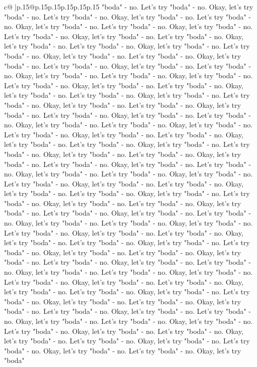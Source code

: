 \documentclass{article}
\begin{document}
{\begin{supertabular}{c@{$\;$}|p{.15\linewidth}@{}p{.15\linewidth}p{.15\linewidth}p{.15\linewidth}p{.15\linewidth}p{.15\linewidth}}
{{{"boda" {-} no. Let's try "boda" {-} no. Okay, let's try "boda" {-} no. Let's try "boda" {-} no. Okay, let's try "boda" {-} no. Let's try "boda" {-} no. Okay, let's try "boda" {-} no. Let's try "boda" {-} no. Okay, let's try "boda" {-} no. Let's try "boda" {-} no. Okay, let's try "boda" {-} no. Let's try "boda" {-} no. Okay, let's try "boda" {-} no. Let's try "boda" {-} no. Okay, let's try "boda" {-} no. Let's try "boda" {-} no. Okay, let's try "boda" {-} no. Let's try "boda" {-} no. Okay, let's try "boda" {-} no. Let's try "boda" {-} no. Okay, let's try "boda" {-} no. Let's try "boda" {-} no. Okay, let's try "boda" {-} no. Let's try "boda" {-} no. Okay, let's try "boda" {-} no. Let's try "boda" {-} no. Okay, let's try "boda" {-} no. Let's try "boda" {-} no. Okay, let's try "boda" {-} no. Let's try "boda" {-} no. Okay, let's try "boda" {-} no. Let's try "boda" {-} no. Okay, let's try "boda" {-} no. Let's try "boda" {-} no. Okay, let's try "boda" {-} no. Let's try "boda" {-} no. Okay, let's try "boda" {-} no. Let's try "boda" {-} no. Okay, let's try "boda" {-} no. Let's try "boda" {-} no. Okay, let's try "boda" {-} no. Let's try "boda" {-} no. Okay, let's try "boda" {-} no. Let's try "boda" {-} no. Okay, let's try "boda" {-} no. Let's try "boda" {-} no. Okay, let's try "boda" {-} no. Let's try "boda" {-} no. Okay, let's try "boda" {-} no. Let's try "boda" {-} no. Okay, let's try "boda" {-} no. Let's try "boda" {-} no. Okay, let's try "boda" {-} no. Let's try "boda" {-} no. Okay, let's try "boda" {-} no. Let's try "boda" {-} no. Okay, let's try "boda" {-} no. Let's try "boda" {-} no. Okay, let's try "boda" {-} no. Let's try "boda" {-} no. Okay, let's try "boda" {-} no. Let's try "boda" {-} no. Okay, let's try "boda" {-} no. Let's try "boda" {-} no. Okay, let's try "boda" {-} no. Let's try "boda" {-} no. Okay, let's try "boda" {-} no. Let's try "boda" {-} no. Okay, let's try "boda" {-} no. Let's try "boda" {-} no. Okay, let's try "boda" {-} no. Let's try "boda" {-} no. Okay, let's try "boda" {-} no. Let's try "boda" {-} no. Okay, let's try "boda" {-} no. Let's try "boda" {-} no. Okay, let's try "boda" {-} no. Let's try "boda" {-} no. Okay, let's try "boda" {-} no. Let's try "boda" {-} no. Okay, let's try "boda" {-} no. Let's try "boda" {-} no. Okay, let's try "boda" {-} no. Let's try "boda" {-} no. Okay, let's try "boda" {-} no. Let's try "boda" {-} no. Okay, let's try "boda" {-} no. Let's try "boda" {-} no. Okay, let's try "boda" {-} no. Let's try "boda" {-} no. Okay, let's try "boda" {-} no. Let's try "boda" {-} no. Okay, let's try "boda" {-} no. Let's try "boda" {-} no. Okay, let's try "boda" {-} no. Let's try "boda" {-} no. Okay, let's try "boda" {-} no. Let's try "boda" {-} no. Okay, let's try "boda" {-} no. Let's try "boda" {-} no. Okay, let's try "boda" {-} no. Let's try "boda" {-} no. Okay, let's try "boda" {-} no. Let's try "boda" {-} no. Okay, let's try "boda" {-} no. Let's try "boda" {-} no. Okay, let's try "boda" {-} no. Let's try "boda" {-} no. Okay, let's try "boda" {-} no. Let's try "boda" {-} no. Okay, let's try "boda" {-} no. Let's try "boda" {-} no. Okay, let's try "boda" {-} no. Let's try "boda" {-} no. Okay, let's try "boda" }}}
\end{supertabular}}
\end{document}
